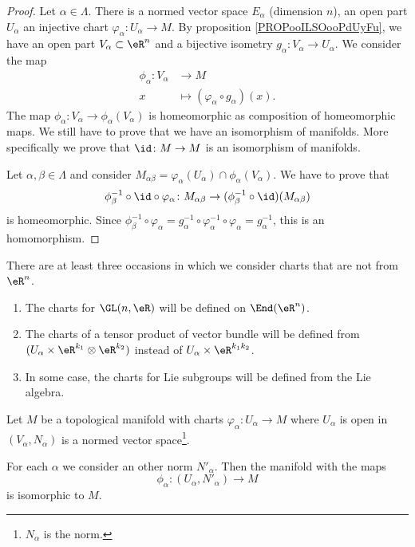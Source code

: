 \begin{proof}
	Let \( \alpha\in \Lambda\). There is a normed vector space \( E_{\alpha} \) (dimension \( n\)), an open part \( U_{\alpha}\) an injective chart \(\varphi_{\alpha} \colon U_{\alpha}\to M  \). By proposition \ref{PROPooILSOooPdUyFu}, we have an open part \( V_{\alpha}\subset \eR^n\) and a bijective isometry \(g_{\alpha} \colon V_{\alpha}\to U_{\alpha}  \). We consider the map
	\begin{equation}
		\begin{aligned}
			\phi_{\alpha}\colon V_{\alpha} & \to M                                          \\
			x                              & \mapsto (\varphi_{\alpha}\circ g_{\alpha})(x).
		\end{aligned}
	\end{equation}
	The map \(\phi_{\alpha} \colon V_{\alpha}\to \phi_{\alpha}(V_{\alpha})   \) is homeomorphic as composition of homeomorphic maps. We still have to prove that we have an isomorphism of manifolds. More specifically we prove that \(\id \colon M\to M  \) is an isomorphism of manifolds.

	Let \( \alpha,\beta\in \Lambda\) and consider \( M_{\alpha\beta}=\varphi_{\alpha}(U_{\alpha})\cap \phi_{\alpha}(V_{\alpha})\). We have to prove that
	\begin{equation}
		\phi_{\beta}^{-1}\circ \id\circ \varphi_{\alpha} \colon M_{\alpha\beta}\to  	(\phi_{\beta}^{-1}\circ\id)(M_{\alpha\beta})
	\end{equation}
	is homeomorphic. Since \( \phi_{\beta}^{-1}\circ\varphi_{\alpha}=g_{\alpha}^{-1}\circ\varphi_{\alpha}^{-1}\circ\varphi_{\alpha}=g_{\alpha}^{-1}\), this is an homomorphism.
\end{proof}

There are at least three occasions in which we consider charts that are not from \( \eR^n\).
\begin{enumerate}
	\item
	      The charts for \( \GL(n,\eR)\) will be defined on \( \End(\eR^n)\).
	\item
	      The charts of a tensor product of vector bundle will be defined from \( (U_{\alpha}\times \eR^{k_1}\otimes \eR^{k_2})\) instead of \( U_{\alpha}\times \eR^{k_1k_2}\).
	\item
	      In some case, the charts for Lie subgroups will be defined from the Lie algebra.
\end{enumerate}


\begin{proposition}	\label{PROPooPYLIooFpCPcu}
	Let \( M\) be a topological manifold with charts \(\varphi_{\alpha} \colon U_{\alpha}\to M  \) where \( U_{\alpha}\) is open in \( (V_{\alpha}, N_\alpha)\) is a normed vector space\footnote{\( N_{\alpha}\) is the norm.}.

	For each \( \alpha\) we consider an other norm \( N'_{\alpha}\). Then the manifold with the maps
	\begin{equation}
		\phi_{\alpha} \colon (U_{\alpha}, N'_{\alpha})\to M
	\end{equation}
	is isomorphic to \( M\).
\end{proposition}


